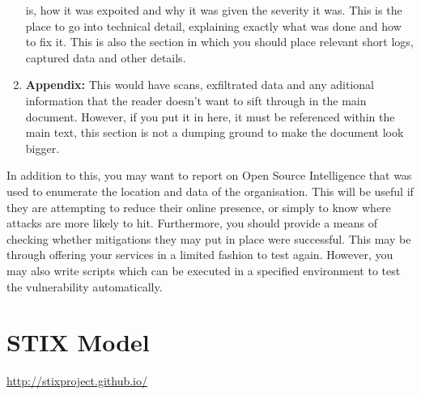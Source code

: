 \begin{enumerate}
				is, how it was expoited and why it was given the severity it was. 
				This is the place to go into technical detail, explaining exactly what was done and how to fix it. 
				This is also the section in which you should place relevant short logs, captured data and other details. 
			\item \textbf{Appendix:} This would have scans, exfiltrated data and any aditional information that the reader doesn't want to sift through in the main document. 
				However, if you put it in here, it must be referenced within the main text, 
				this section is not a dumping ground to make the document look bigger. 
		\end{enumerate}
		
		In addition to this, you may want to report on Open Source Intelligence that was used to enumerate the location and 
		data of the organisation. 
		This will be useful if they are attempting to reduce their online presence, or simply to know where attacks are more likely to hit. 
		Furthermore, you should provide a means of checking whether mitigations they may put in place were successful. 
		This may be through offering your services in a limited fashion to test again. 
		However, you may also write scripts which can be executed in a specified environment to test the vulnerability automatically. 

	\section{STIX Model}
		\url{http://stixproject.github.io/}
\newpage
